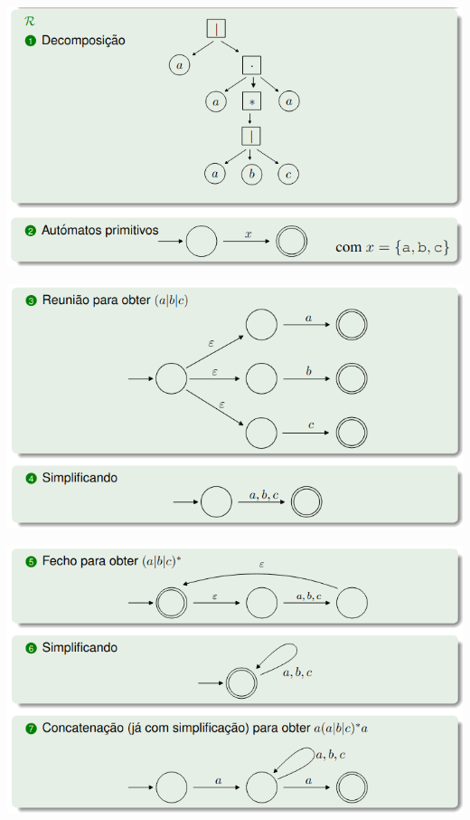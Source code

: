 \documentclass{article}
\begin{document}
\begin{flushleft}
  \begin{center}
    \includegraphics[scale=0.4]{77}
  \end{center}
  \begin{center}
    \includegraphics[scale=0.4]{78}
  \end{center}
  \begin{center}
    \includegraphics[scale=0.4]{79}
  \end{center}

\end{flushleft}
\end{document}
